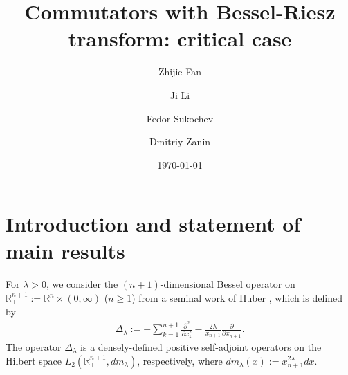 \documentclass{amsart}
\begin{document}
\baselineskip 16.6pt
\hfuzz=6pt

\newtheorem{cl}{Claim}
\newtheorem{theorem}{Theorem}[section]
\newtheorem{proposition}[theorem]{Proposition}
\newtheorem{coro}[theorem]{Corollary}
\newtheorem{lemma}[theorem]{Lemma}
\newtheorem{definition}[theorem]{Definition}
\newtheorem{assum}{Assumption}[section]
\newtheorem{example}[theorem]{Example}
\newtheorem{remark}[theorem]{Remark}
\newtheorem{fact}[theorem]{Fact}
\newtheorem{nota}[theorem]{Notation}
\renewcommand{\theequation}
{\thesection.\arabic{equation}}


\title[]{Commutators with Bessel-Riesz transform: critical case}

\author{Zhijie Fan}
\address{Zhijie Fan, School of Mathematics and Information Science,
Guangzhou University, Guangzhou 510006, China}

\author{Ji Li}
\address{Ji Li, School of Mathematical and Physical Sciences, Macquarie University, NSW 2109, Australia}

\author{Fedor Sukochev}
\address{Fedor Sukochev, University of New South Wales, Kensington, NSW 2052, Australia}

\author{Dmitriy Zanin}
\address{Dmitriy Zanin, University of New South Wales, Kensington, NSW 2052, Australia}







\date{\today}





\begin{abstract}

\end{abstract}

\maketitle


\tableofcontents



\section{Introduction and statement of main results}
For $\lambda> 0$, we consider the $(n+1)$-dimensional Bessel operator on $\mathbb{R}^{n+1}_+:=\mathbb{R}^n\times (0,\infty)$ ($n\geq 1$) from a seminal work of Huber \cite{MR64284}, which is defined by
\begin{align}\label{Dlambda}
\Delta_\lambda:= -\sum_{k=1}^{n+1}\frac{\partial^2}{\partial x_k^2}-\frac{2\lambda}{x_{n+1}}\frac{\partial}{\partial x_{n+1}}.
\end{align}
The operator $\Delta_\lambda$ is a densely-defined positive self-adjoint operators on the Hilbert space $L_2(\mathbb{R}_+^{n+1}, dm_\lambda)$, respectively,  where $dm_\lambda(x):=x_{n+1}^{2\lambda}dx.$
\end{document}
